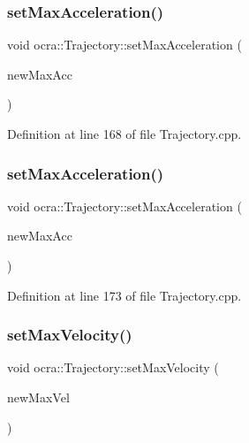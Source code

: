 \subsubsection{\texorpdfstring{set\+Max\+Acceleration()}{setMaxAcceleration()}\hspace{0.1cm}{\footnotesize\ttfamily [1/2]}}
{\footnotesize\ttfamily void ocra\+::\+Trajectory\+::set\+Max\+Acceleration (\begin{DoxyParamCaption}\item[{double}]{new\+Max\+Acc }\end{DoxyParamCaption})}



Definition at line 168 of file Trajectory.\+cpp.

\hypertarget{classocra_1_1Trajectory_a0fa531fd1f33f142a7d1b3324a478cb9}{}\label{classocra_1_1Trajectory_a0fa531fd1f33f142a7d1b3324a478cb9} 
\subsubsection{\texorpdfstring{set\+Max\+Acceleration()}{setMaxAcceleration()}\hspace{0.1cm}{\footnotesize\ttfamily [2/2]}}
{\footnotesize\ttfamily void ocra\+::\+Trajectory\+::set\+Max\+Acceleration (\begin{DoxyParamCaption}\item[{const Eigen\+::\+Vector\+Xd \&}]{new\+Max\+Acc }\end{DoxyParamCaption})}



Definition at line 173 of file Trajectory.\+cpp.

\hypertarget{classocra_1_1Trajectory_a12e4348201fbdc32d34ce1627d6da1fd}{}\label{classocra_1_1Trajectory_a12e4348201fbdc32d34ce1627d6da1fd} 
\subsubsection{\texorpdfstring{set\+Max\+Velocity()}{setMaxVelocity()}\hspace{0.1cm}{\footnotesize\ttfamily [1/2]}}
{\footnotesize\ttfamily void ocra\+::\+Trajectory\+::set\+Max\+Velocity (\begin{DoxyParamCaption}\item[{double}]{new\+Max\+Vel }\end{DoxyParamCaption})}



